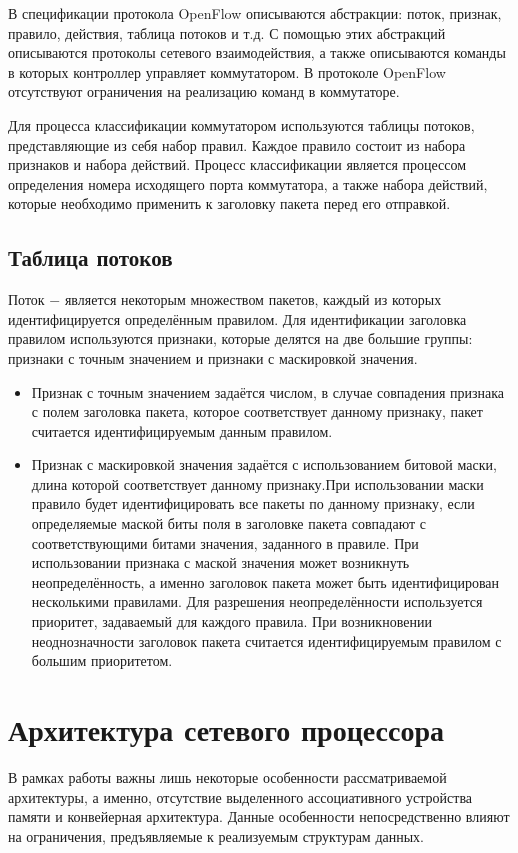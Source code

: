 \documentclass[a4paper, 12pt, titlepage, finall]{extreport}
\begin{document}
            В спецификации протокола OpenFlow описываются абстракции: поток, признак, правило, действия, таблица потоков и т.д. С помощью этих абстракций описываются
            протоколы сетевого взаимодействия, а также описываются команды в которых контроллер управляет коммутатором. В протоколе OpenFlow отсутствуют ограничения
            на реализацию команд в коммутаторе.

            Для процесса классификации коммутатором используются таблицы потоков, представляющие из себя набор правил. Каждое правило состоит из набора признаков
            и набора действий. Процесс классификации является процессом определения номера исходящего порта коммутатора, а также набора действий, которые необходимо 
            применить к заголовку пакета перед его отправкой.
            \subsection{Таблица потоков}
                Поток $-$ является некоторым множеством пакетов, каждый из которых идентифицируется определённым правилом. Для идентификации заголовка правилом
                используются признаки, которые делятся на две большие группы: признаки с точным значением и признаки с маскировкой значения.
                \begin{itemize}
                    \item Признак с точным значением задаётся числом, в случае совпадения признака с полем заголовка пакета, которое соответствует данному признаку,
                        пакет считается идентифицируемым данным правилом.
                    \item Признак с маскировкой значения задаётся с использованием битовой маски, длина которой соответствует данному признаку.При использовании
                        маски правило будет идентифицировать все пакеты по данному признаку, если определяемые маской биты поля в заголовке пакета совпадают с соответствующими битами
                        значения, заданного в правиле. При использовании признака с маской значения может возникнуть неопределённость, а именно заголовок пакета может
                        быть идентифицирован несколькими правилами. Для разрешения неопределённости используется приоритет, задаваемый для каждого правила. При возникновении
                        неоднозначности заголовок пакета считается идентифицируемым правилом с большим приоритетом.
                \end{itemize}
        \section{Архитектура сетевого процессора}
            \label{sect:arch}
            В рамках работы важны лишь некоторые особенности рассматриваемой архитектуры, а именно, отсутствие выделенного ассоциативного устройства памяти и конвейерная архитектура. 
            Данные особенности непосредственно влияют на ограничения, предъявляемые к реализуемым структурам данных.
\end{document}
